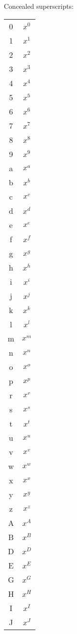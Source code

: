 \documentclass{article}
\begin{document}
Concealed superscripts:

\begin{tabular}{c|c}
    0 & \(x^0\)\\
    1 & \(x^1\)\\
    2 & \(x^2\)\\
    3 & \(x^3\)\\
    4 & \(x^4\)\\
    5 & \(x^5\)\\
    6 & \(x^6\)\\
    7 & \(x^7\)\\
    8 & \(x^8\)\\
    9 & \(x^9\)\\
    a & \(x^a\)\\
    b & \(x^b\)\\
    c & \(x^c\)\\
    d & \(x^d\)\\
    e & \(x^e\)\\
    f & \(x^f\)\\
    g & \(x^g\)\\
    h & \(x^h\)\\
    i & \(x^i\)\\
    j & \(x^j\)\\
    k & \(x^k\)\\
    l & \(x^l\)\\
    m & \(x^m\)\\
    n & \(x^n\)\\
    o & \(x^o\)\\
    p & \(x^p\)\\
    r & \(x^r\)\\
    s & \(x^s\)\\
    t & \(x^t\)\\
    u & \(x^u\)\\
    v & \(x^v\)\\
    w & \(x^w\)\\
    x & \(x^x\)\\
    y & \(x^y\)\\
    z & \(x^z\)\\
    A & \(x^A\)\\
    B & \(x^B\)\\
    D & \(x^D\)\\
    E & \(x^E\)\\
    G & \(x^G\)\\
    H & \(x^H\)\\
    I & \(x^I\)\\
    J & \(x^J\)\\

\end{tabular}
\end{document}

